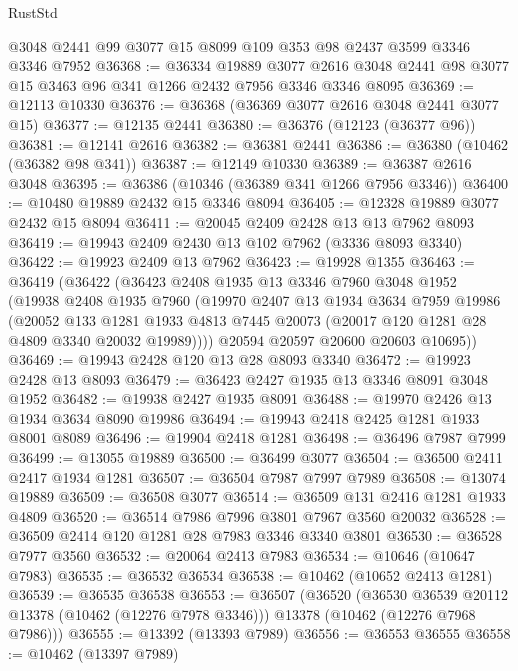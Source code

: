 \begin{lexlean}{RustStd}
\begin{coremodule}
    @3048
    @2441
    @99
    @3077
    @15
    @8099
    @109
    @353
    @98
    @2437
    @3599
    @3346
    @3346
    @7952
@36368 := @36334
    @19889
    @3077
    @2616
    @3048
    @2441
    @98
    @3077
    @15
    @3463
    @96
    @341
    @1266
    @2432
    @7956
    @3346
    @3346
    @8095
@36369 := @12113 @10330
@36376 := @36368 (@36369 @3077 @2616 @3048 @2441 @3077 @15)
@36377 := @12135 @2441
@36380 := @36376 (@12123 (@36377 @96))
@36381 := @12141 @2616
@36382 := @36381 @2441
@36386 := @36380 (@10462 (@36382 @98 @341))
@36387 := @12149 @10330
@36389 := @36387 @2616 @3048
@36395 := @36386 (@10346 (@36389 @341 @1266 @7956 @3346))
@36400 := @10480 @19889 @2432 @15 @3346 @8094
@36405 := @12328 @19889 @3077 @2432 @15 @8094
@36411 := @20045 @2409 @2428 @13 @13 @7962 @8093
@36419 := @19943 @2409 @2430 @13 @102 @7962 (@3336 @8093 @3340)
@36422 := @19923 @2409 @13 @7962
@36423 := @19928 @1355
@36463 := @36419
    (@36422
      (@36423
        @2408
        @1935
        @13
        @3346
        @7960
        @3048
        @1952
        (@19938
          @2408
          @1935
          @7960
          (@19970
            @2407
            @13
            @1934
            @3634
            @7959
            @19986
            (@20052
              @133
              @1281
              @1933
              @4813
              @7445
              @20073
              (@20017 @120 @1281 @28 @4809 @3340 @20032 @19989))))
        @20594
        @20597
        @20600
        @20603
        @10695))
@36469 := @19943 @2428 @120 @13 @28 @8093 @3340
@36472 := @19923 @2428 @13 @8093
@36479 := @36423 @2427 @1935 @13 @3346 @8091 @3048 @1952
@36482 := @19938 @2427 @1935 @8091
@36488 := @19970 @2426 @13 @1934 @3634 @8090 @19986
@36494 := @19943 @2418 @2425 @1281 @1933 @8001 @8089
@36496 := @19904 @2418 @1281
@36498 := @36496 @7987 @7999
@36499 := @13055 @19889
@36500 := @36499 @3077
@36504 := @36500 @2411 @2417 @1934 @1281
@36507 := @36504 @7987 @7997 @7989
@36508 := @13074 @19889
@36509 := @36508 @3077
@36514 := @36509 @131 @2416 @1281 @1933 @4809
@36520 := @36514 @7986 @7996 @3801 @7967 @3560 @20032
@36528 := @36509 @2414 @120 @1281 @28 @7983 @3346 @3340 @3801
@36530 := @36528 @7977 @3560
@36532 := @20064 @2413 @7983
@36534 := @10646 (@10647 @7983)
@36535 := @36532 @36534
@36538 := @10462 (@10652 @2413 @1281)
@36539 := @36535 @36538
@36553 := @36507
    (@36520
      (@36530 @36539 @20112 @13378 (@10462 (@12276 @7978 @3346)))
      @13378
      (@10462 (@12276 @7968 @7986)))
@36555 := @13392 (@13393 @7989)
@36556 := @36553 @36555
@36558 := @10462 (@13397 @7989)

\end{coremodule}
\end{lexlean}
